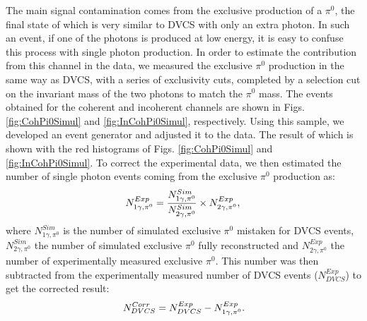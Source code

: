\documentclass[aps,prc,preprint,superscriptaddress]{revtex4}
\begin{document}
The main signal contamination comes 
from the exclusive production of a $\pi^0$, the final state of which is very similar to DVCS with 
only an extra photon. In such an event, if one of the photons is produced at low energy, it is 
easy to confuse this process with single photon production. In order to estimate the contribution from
this channel in the data, we measured the exclusive $\pi^0$ production in the same way as DVCS, with 
a series of exclusivity cuts, completed by a selection cut on the invariant mass of the two photons
to match the $\pi^0$ mass. The events obtained for the coherent and incoherent
channels are shown in Figs. \ref{fig:CohPi0Simul} and \ref{fig:InCohPi0Simul}, respectively. Using 
this sample, we developed an event generator and adjusted it to the data. The result of which 
is shown with the red histograms of Figs. \ref{fig:CohPi0Simul} and 
\ref{fig:InCohPi0Simul}. To correct the experimental data, we then estimated the number of single photon 
events coming from the exclusive $\pi^0$ production as:
\begin{equation}
	N_{1\gamma,\pi^0}^{Exp} = \frac{N_{1\gamma,\pi^0}^{Sim}}{N_{2\gamma,\pi^0}^{Sim}} \times N_{2\gamma,\pi^0}^{Exp},\\
\end{equation}
where $N_{1\gamma,\pi^0}^{Sim}$ is the number of simulated exclusive $\pi^0$ mistaken for DVCS events,
$N_{2\gamma,\pi^0}^{Sim}$ the number of simulated exclusive $\pi^0$ fully reconstructed and $N_{2\gamma,\pi^0}^{Exp}$
the number of experimentally measured exclusive $\pi^0$. This number was then subtracted from
the experimentally measured number of DVCS events ($N_{DVCS}^{Exp}$) to get the corrected result: 
\begin{equation}
	N_{DVCS}^{Corr} = N_{DVCS}^{Exp} - N_{1\gamma,\pi^0}^{Exp}.\\
\end{equation}
\end{document}

